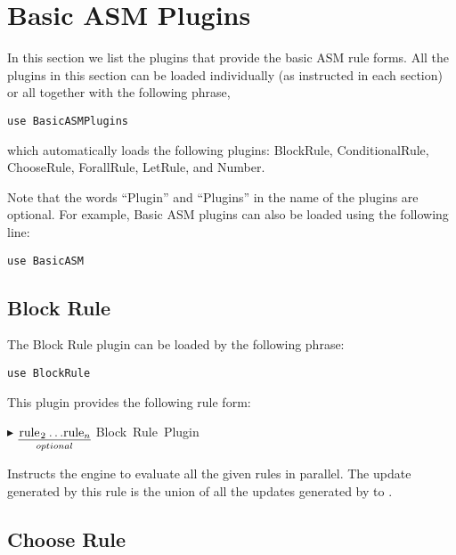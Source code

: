 \documentclass{article}
\newcommand{\ruleform}[2]{\pform{$\blacktriangleright$}{#1}{#2}}
\newcommand{\pform}[3]{\vspace*{4mm} \noindent #1 #2 \vspace{1mm}\textcolor[gray]{0.7}{\dotfill}\mbox{{\sffamily \footnotesize #3}}}
\newcommand{\optional}[1]{$\underset{optional}{\underline{\mbox{#1}}}$}
\begin{document}
\section{Basic ASM Plugins}
\label{basicASM}

In this section we list the plugins that provide the basic ASM rule forms. All
the plugins in this section can be loaded individually (as instructed in each
section) or all together with the following  phrase, 

\begin{lstlisting}
use BasicASMPlugins
\end{lstlisting}

\noindent which automatically loads the following plugins: BlockRule,
ConditionalRule, ChooseRule, ForallRule, LetRule, and
Number.

Note that the words ``Plugin'' and ``Plugins'' in the name of the plugins are optional.
For example, Basic ASM plugins can also be loaded using the following line:

\begin{lstlisting}
use BasicASM
\end{lstlisting}


\subsection{Block Rule}
\label{block}

The Block Rule plugin can be loaded by the following  phrase:

\begin{lstlisting}
use BlockRule
\end{lstlisting}

\noindent This plugin provides the following rule form:

\ruleform{ \optional{\asm{rule$_2$ $\:\ldots$ rule$_n$}} \asm{endpar}}{Block Rule Plugin}

Instructs the engine to evaluate all the given rules in parallel. The update 
generated by this rule is the union of all the updates generated by  to . %


\subsection{Choose Rule}
\label{choose}
\end{document}
